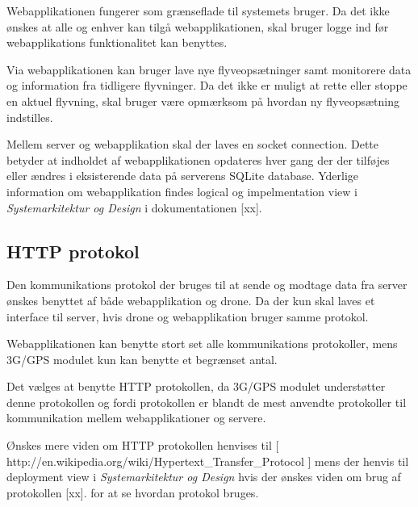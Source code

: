 Webapplikationen fungerer som grænseflade til systemets bruger. Da det ikke ønskes at alle og enhver kan tilgå webapplikationen, skal bruger logge ind før webapplikations funktionalitet kan benyttes. 

Via webapplikationen kan bruger lave nye flyveopsætninger samt monitorere data og information fra tidligere flyvninger. Da det ikke er muligt at rette eller stoppe en aktuel flyvning, skal bruger være opmærksom på hvordan ny flyveopsætning indstilles. 

Mellem server og webapplikation skal der laves en socket connection. Dette betyder at indholdet af webapplikationen opdateres hver gang der der tilføjes eller ændres i eksisterende data på serverens SQLite database. Yderlige information om webapplikation findes logical og impelmentation view i \textit{Systemarkitektur og Design} i dokumentationen [xx].


\subsection{HTTP protokol}

Den kommunikations protokol der bruges til at sende og modtage data fra server ønskes benyttet af både webapplikation og drone. Da der kun skal laves et interface til server, hvis drone og webapplikation bruger samme protokol.

Webapplikationen kan benytte stort set alle kommunikations protokoller, mens 3G/GPS modulet kun kan benytte et begrænset antal.

Det vælges at benytte HTTP protokollen, da 3G/GPS modulet understøtter denne protokollen og fordi protokollen er blandt de mest anvendte protokoller til kommunikation mellem webapplikationer og servere.

Ønskes mere viden om HTTP protokollen henvises til [ http://en.wikipedia.org/wiki/Hypertext\_Transfer\_Protocol ] mens der henvis til deployment view i \textit{Systemarkitektur og Design} hvis der ønskes viden om brug af protokollen [xx]. for at se hvordan protokol bruges.